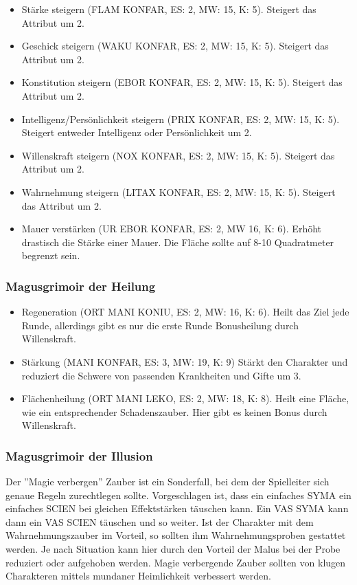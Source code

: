 \documentclass{article}
\begin{document}
\begin{itemize}
\item Stärke steigern (FLAM KONFAR, ES: 2, MW: 15, K: 5). Steigert das Attribut um 2.
\item Geschick steigern (WAKU KONFAR, ES: 2, MW: 15, K: 5). Steigert das Attribut um 2.
\item Konstitution steigern (EBOR KONFAR, ES: 2, MW: 15, K: 5). Steigert das Attribut um 2.
\item Intelligenz/Persönlichkeit steigern (PRIX KONFAR, ES: 2, MW: 15, K: 5). Steigert entweder Intelligenz oder Persönlichkeit um 2.
\item Willenskraft steigern (NOX KONFAR, ES: 2, MW: 15, K: 5). Steigert das Attribut um 2.
\item Wahrnehmung steigern (LITAX KONFAR, ES: 2, MW: 15, K: 5). Steigert das Attribut um 2.
\item Mauer verstärken (UR EBOR KONFAR, ES: 2, MW 16, K: 6). Erhöht drastisch die Stärke einer Mauer. Die Fläche sollte auf 8-10 Quadratmeter begrenzt sein.
\end{itemize}

\subsubsection{Magusgrimoir der Heilung}

\begin{itemize}
\item Regeneration (ORT MANI KONIU, ES: 2, MW: 16, K: 6). Heilt das Ziel jede Runde, allerdings gibt es nur die erste Runde Bonusheilung durch Willenskraft.
\item Stärkung (MANI KONFAR, ES: 3, MW: 19, K: 9) Stärkt den Charakter und reduziert die Schwere von passenden Krankheiten und Gifte um 3.
\item Flächenheilung (ORT MANI LEKO, ES: 2, MW: 18, K: 8). Heilt eine Fläche, wie ein entsprechender Schadenszauber. Hier gibt es keinen Bonus durch Willenskraft.
\end{itemize}

\subsubsection{Magusgrimoir der Illusion}

Der ''Magie verbergen'' Zauber ist ein Sonderfall, bei dem der Spielleiter sich genaue Regeln zurechtlegen sollte.
Vorgeschlagen ist, dass ein einfaches SYMA ein einfaches SCIEN bei gleichen Effektstärken täuschen kann. Ein VAS SYMA
kann dann ein VAS SCIEN täuschen und so weiter. Ist der Charakter mit dem Wahrnehmungszauber im Vorteil, so sollten
ihm Wahrnehmungsproben gestattet werden. Je nach Situation kann hier durch den Vorteil der Malus bei der Probe
reduziert oder aufgehoben werden. Magie verbergende Zauber sollten von klugen Charakteren mittels mundaner
Heimlichkeit verbessert werden.
\end{document}
